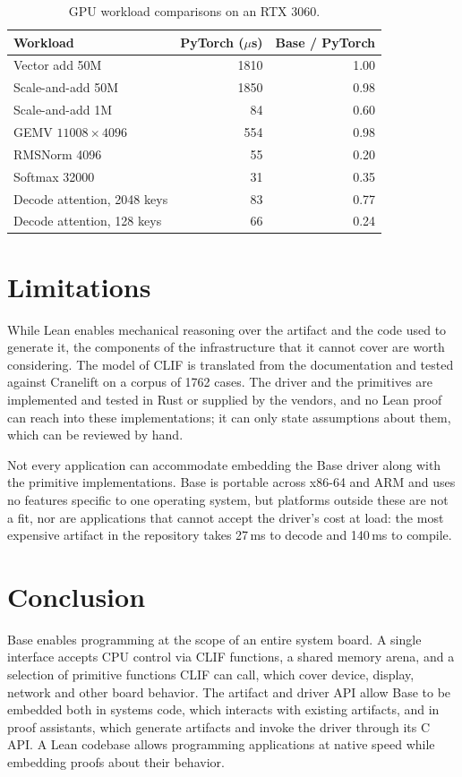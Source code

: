 \documentclass[11pt]{article}
\begin{document}
\begin{table}[H]
\centering
\caption{GPU workload comparisons on an RTX 3060.}
\label{tab:gpu}
\begin{tabular}{@{}lrr@{}}
\toprule
Workload & PyTorch ($\mu$s) & Base / PyTorch \\
\midrule
Vector add 50M & 1810 & 1.00 \\
Scale-and-add 50M & 1850 & 0.98 \\
Scale-and-add 1M & 84 & 0.60 \\
GEMV $11008 \times 4096$ & 554 & 0.98 \\
RMSNorm 4096 & 55 & 0.20 \\
Softmax 32000 & 31 & 0.35 \\
Decode attention, 2048 keys & 83 & 0.77 \\
Decode attention, 128 keys & 66 & 0.24 \\
\bottomrule
\end{tabular}
\end{table}

\section{Limitations}
\label{sec:trust}

While Lean enables mechanical reasoning over the artifact and the code used to
generate it, the components of the infrastructure that it cannot cover are worth
considering. The model of CLIF is translated from the documentation and tested
against Cranelift on a corpus of 1762 cases. The driver and the primitives are
implemented and tested in Rust or supplied by the vendors, and no Lean proof can reach into these
implementations; it can only state assumptions about them, which can be reviewed
by hand.

Not every application can accommodate embedding the Base driver along with the
primitive implementations. Base is portable across x86-64 and ARM and uses no
features specific to one operating system, but platforms outside these are not a
fit, nor are applications that cannot accept the driver's cost at load: the most
expensive artifact in the repository takes 27\,ms to decode and 140\,ms to
compile.

\section{Conclusion}
Base enables programming at the scope of an entire system board. A single
interface accepts CPU control via CLIF functions, a shared memory arena, and a
selection of primitive functions CLIF can call, which cover device, display, network and
other board behavior.
The artifact and driver API allow Base to be embedded both in systems code, which
interacts with existing artifacts, and in proof assistants, which generate
artifacts and invoke the driver through its C API.
A Lean codebase allows programming applications at native speed while embedding
proofs about their behavior.
\end{document}
